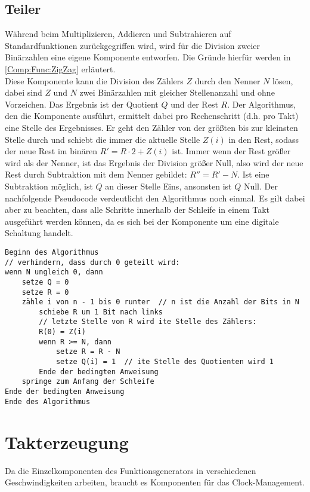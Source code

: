 \subsection{Teiler} \label{Comp:Arith:Division}
Während beim Multiplizieren, Addieren und Subtrahieren auf Standardfunktionen
zurückgegriffen wird, wird für die Division zweier Binärzahlen eine eigene
Komponente entworfen. Die Gründe hierfür werden in \cref{Comp:Func:ZigZag}
erläutert. \\ %
Diese Komponente kann die Division des Zählers $Z$ durch den Nenner $N$
lösen, dabei sind $Z$ und $N$ zwei Binärzahlen mit gleicher
Stellenanzahl und ohne Vorzeichen. Das Ergebnis ist der Quotient $Q$ und der Rest $R$. Der Algorithmus, den die Komponente ausführt, ermittelt dabei pro Rechenschritt (d.h. pro Takt) eine Stelle des Ergebnisses.
Er geht den Zähler von der größten bis zur kleinsten Stelle durch und schiebt die immer die aktuelle Stelle $Z(i)$ in den Rest, sodass der neue Rest im binären $R' = R \cdot 2 + Z(i)$ ist.
Immer wenn der Rest größer wird als der Nenner, ist das Ergebnis der Division größer Null, also wird der neue Rest durch Subtraktion mit dem Nenner gebildet: $R'' = R' - N$.
Ist eine Subtraktion möglich, ist $Q$ an dieser Stelle Eins, ansonsten ist $Q$ Null. Der nachfolgende Pseudocode verdeutlicht den Algorithmus noch einmal.
Es gilt dabei aber zu beachten, dass alle Schritte innerhalb der Schleife in einem Takt ausgeführt werden können, da es sich bei der Komponente um eine digitale Schaltung handelt.

\begin{verbatim}
Beginn des Algorithmus
// verhindern, dass durch 0 geteilt wird:
wenn N ungleich 0, dann
    setze Q = 0
    setze R = 0
    zähle i von n - 1 bis 0 runter  // n ist die Anzahl der Bits in N
        schiebe R um 1 Bit nach links
        // letzte Stelle von R wird ite Stelle des Zählers:
        R(0) = Z(i)                    
        wenn R >= N, dann               
            setze R = R - N
            setze Q(i) = 1  // ite Stelle des Quotienten wird 1 
        Ende der bedingten Anweisung
    springe zum Anfang der Schleife
Ende der bedingten Anweisung
Ende des Algorithmus
\end{verbatim}

\section{Takterzeugung}
Da die Einzelkomponenten des Funktionsgenerators in verschiedenen Geschwindigkeiten arbeiten, braucht es Komponenten für das Clock-Management. 
